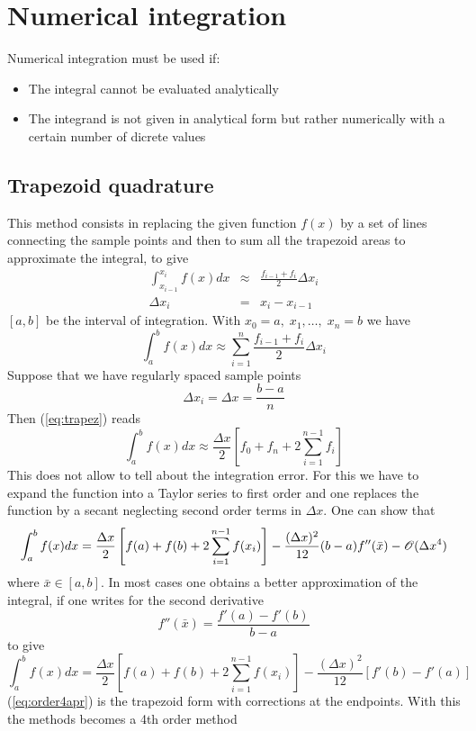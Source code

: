 \section{Numerical integration}
Numerical integration must be used if:
\begin{itemize}
	\item The integral cannot be evaluated analytically
	\item The integrand is not given in analytical form but rather
		numerically with a certain number of dicrete values
\end{itemize}
		
\subsection{Trapezoid quadrature}
This method consists in replacing the given function $f(x)$ by a set of lines connecting the sample points and then to sum all the trapezoid areas to approximate the integral, to give
\begin{eqnarray*}
	\int_{x_{i-1}}^{x_i}f(x)dx&\approx &\frac{f_{i-1}+f_i}{2}\Delta x_i\\
	\Delta x_i&=&x_i-x_{i-1}
\end{eqnarray*}
$[a,b]$ be the interval of integration. With $x_0=a,\; x_1,\dots,\; x_n=b$ we have
\begin{equation}
	\int_{a}^{b}f(x)dx\approx \sum_{i=1}^n\frac{f_{i-1}+f_i}{2}\Delta x_i
	\label{eq:trapez}
\end{equation}
Suppose that we have regularly spaced sample points
\[ \Delta x_i=\Delta x=\frac{b-a}{n} \]
Then (\ref{eq:trapez}) reads
\[\int_a^bf(x)dx\approx\frac{\Delta x}{2}\left[ f_0+f_n+2\sum_{i=1}^{n-1}f_i\right]\]
This does not allow to tell about the integration error. For this we have to
expand the function into a Taylor series to first order and one replaces the
function by a secant neglecting second order terms in $\Delta x$. One can show
that
\begin{equation}
	\int_a^bf(x)dx=\frac{\Delta x}{2}\left[ f(a)+f(b)+2\sum_{i=1}^{n-1}f(x_i)\right]
	-\frac{(\Delta x)^2}{12}(b-a)f''(\bar{x})-{\cal O}(\Delta x^4)
	\label{eq:order4}
\end{equation}
where $\bar{x}\in[a,b]$. In most cases one obtains a better approximation
of the integral, if one writes for the second derivative
\[ f''(\bar{x})=\frac{f'(a)-f'(b)}{b-a} \]
to give
\begin{equation}
        \int_a^bf(x)dx=\frac{\Delta x}{2}\left[ f(a)+f(b)+2\sum_{i=1}^{n-1}f(x_i)\right]
        -\frac{(\Delta x)^2}{12}\left[ f'(b)-f'(a)\right]
        \label{eq:order4apr}
\end{equation}
(\ref{eq:order4apr}) is the trapezoid form with corrections at the
endpoints. With this the methods becomes a 4th order method
